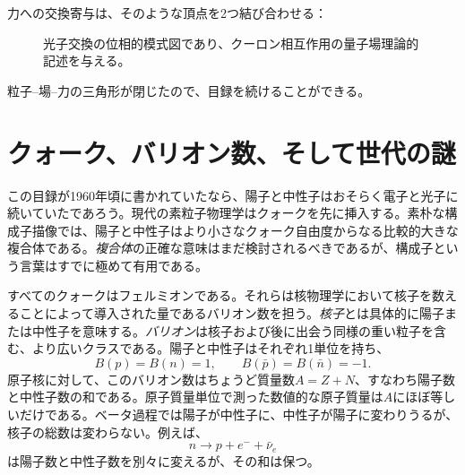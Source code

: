 力への交換寄与は、そのような頂点を2つ結び合わせる：

\begin{figure}[h]
\centering
{}
\caption{光子交換の位相的模式図であり、クーロン相互作用の量子場理論的記述を与える。}
\end{figure}

粒子--場--力の三角形が閉じたので、目録を続けることができる。

\section{クォーク、バリオン数、そして世代の謎}

この目録が1960年頃に書かれていたなら、陽子と中性子はおそらく電子と光子に続いていたであろう。現代の素粒子物理学はクォークを先に挿入する。素朴な構成子描像では、陽子と中性子はより小さなクォーク自由度からなる比較的大きな複合体である。\emph{複合体}の正確な意味はまだ検討されるべきであるが、構成子という言葉はすでに極めて有用である。

すべてのクォークはフェルミオンである。それらは核物理学において核子を数えることによって導入された量であるバリオン数を担う。\emph{核子}とは具体的に陽子または中性子を意味する。\emph{バリオン}は核子および後に出会う同様の重い粒子を含む、より広いクラスである。陽子と中性子はそれぞれ1単位を持ち、
\begin{equation}
B(p)=B(n)=1,
\qquad
B(\bar p)=B(\bar n)=-1.
\end{equation}
原子核に対して、このバリオン数はちょうど質量数\(A=Z+N\)、すなわち陽子数と中性子数の和である。原子質量単位で測った数値的な原子質量は\(A\)にほぼ等しいだけである。ベータ過程では陽子が中性子に、中性子が陽子に変わりうるが、核子の総数は変わらない。例えば、
\begin{equation}
n\longrightarrow p+e^-+\bar\nu_e
\end{equation}
は陽子数と中性子数を別々に変えるが、その和は保つ。

\begin{classroomqa}
\end{classroomqa}

